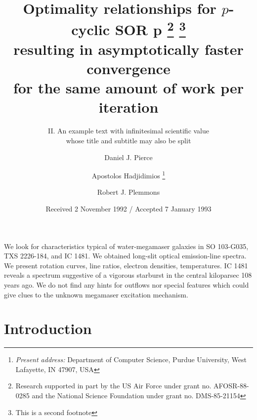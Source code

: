 \documentclass{aa}
\begin{document}
\title{Optimality relationships for $p$-cyclic SOR p
  \thanks{Research supported in part by the US Air Force
    under grant no. AFOSR-88-0285 and
    the National Science Foundation under grant
    no. DMS-85-21154}\fnmsep
  \thanks{This is a second footnote}\\
  resulting in asymptotically faster convergence\\
  for the same amount of work per iteration}

\subtitle{II. An example text with infinitesimal
  scientific value\\
  whose title and subtitle may also be split}

\author{Daniel J. Pierce
  \and Apostolos Hadjidimios
  \thanks{\emph{Present address:}
    Department of Computer Science, Purdue University,
    West Lafayette, IN 47907, USA}
     \and Robert J. Plemmons}



\date{Received 2 November 1992 / Accepted 7 January 1993}

\abstract {} {We look for characteristics typical of water-megamaser galaxies
in SO 103-G035, TXS 2226-184, and IC 1481.} {We obtained long-slit optical
emission-line spectra.} {We present rotation curves, line ratios, electron
densities, temperatures. IC 1481 reveals a spectrum suggestive of a vigorous
starburst in the central kiloparsec 108 years ago.} {We do not find any hints
for outflows nor special features which could give clues to the unknown
megamaser excitation mechanism.}

\maketitle 

\section{Introduction}
\label{sec:intro}
\end{document}
